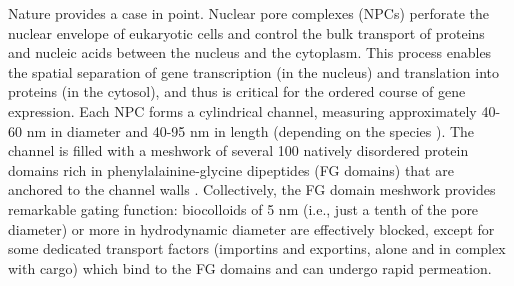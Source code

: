 \documentclass[12pt, a4paper]{article}
\begin{document}
Nature provides a case in point.
Nuclear pore complexes (NPCs) perforate the nuclear envelope of eukaryotic cells and control the bulk transport of proteins and nucleic acids between the nucleus and the cytoplasm.
This process enables the spatial separation of gene transcription (in the nucleus) and translation into proteins (in the cytosol), and thus is critical for the ordered course of gene expression.
Each NPC forms a cylindrical channel, measuring approximately 40-60 nm in diameter and 40-95 nm in length (depending on the species \cite{Yang1998, Beck2004, VonAppen2015, Alberts2015, Hayama2017, Holzer2018}).
The channel is filled with a meshwork of several 100 natively disordered protein domains rich in phenylalainine-glycine dipeptides (FG domains) that are anchored to the channel walls \cite{Holzer2018, Ori2013, Rout2000, Dickmanns2015}.
Collectively, the FG domain meshwork provides remarkable gating function: biocolloids of 5 nm (i.e., just a tenth of the pore diameter) or more in hydrodynamic diameter are effectively blocked, except for some dedicated transport factors (importins and exportins, alone and in complex with cargo) which bind to the FG domains and can undergo rapid permeation. 

\end{document}
